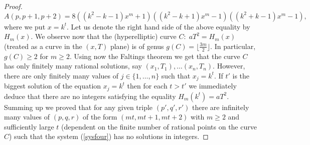 \documentclass[10pt]{amsart}
\theoremstyle{plain}
\begin{document}
\begin{proof}
\begin{equation*}
A(p,p+1,p+2)=8((k^2-k-1)x^{m}+1)((k^2-k+1)x^{m}-1)((k^2+k-1)x^{m}-1),
\end{equation*}
where we put $x=k^{t}$. Let us denote the right hand side of the above equality by $H_{m}(x)$. We observe now that the (hyperelliptic) curve $C:\;aT^2=H_{m}(x)$ (treated as a curve in the $(x,T)$ plane) is of genus $g(C)=\lfloor\frac{3m}{2}\rfloor$. In particular, $g(C)\geq 2$ for $m\geq 2$. Using now the Faltings theorem \cite{Fal} we get that the curve $C$ has only finitely many rational solutions, say $(x_{1},T_{1}),\ldots (x_{n},T_{n})$. However, there are only finitely many values of $j\in\{1,\ldots,n\}$ such that $x_{j}=k^{t}$. If $t'$ is the biggest solution of the equation $x_{j}=k^{t}$ then for each $t>t'$ we immediately deduce that there are no integers satisfying the equality $H_{m}(k^{t})=aT^{2}$. Summing up we proved that for any given triple $(p',q',r')$ there are infinitely many values of $(p,q,r)$ of the form $(mt, mt+1, mt+2)$ with $m\geq 2$ and sufficiently large $t$ (dependent on the finite number of rational points on the curve $C$) such that the system (\ref{sysfour}) has no solutions in integers.
\end{proof}
\end{document}
